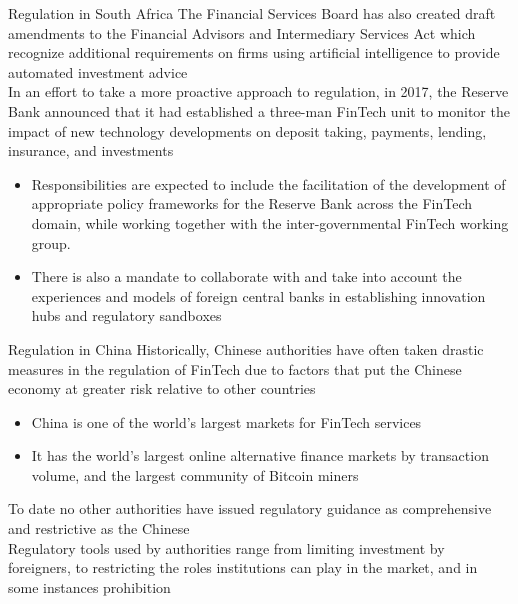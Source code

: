 \documentclass[11pt]{beamer}
\begin{document}

\begin{frame}{Regulation in South Africa}
	The Financial Services Board has also created draft amendments to the Financial Advisors and Intermediary Services Act which recognize additional requirements on firms using artificial intelligence to provide automated investment advice \\ \vspace{3mm}
	In an effort to take a more proactive approach to regulation, in 2017, the Reserve Bank announced that it had established a three-man FinTech unit to monitor the impact of new technology developments on deposit taking, payments, lending, insurance, and investments
	\begin{itemize}
		\item Responsibilities are expected to include the facilitation of the development of appropriate policy frameworks for the Reserve Bank across the FinTech domain, while working together with the inter-governmental FinTech working group.
		\item There is also a mandate to collaborate with and take into account the experiences and models of foreign central banks in establishing innovation hubs and regulatory sandboxes
	\end{itemize}
\end{frame}


\begin{frame}{Regulation in China}
	Historically, Chinese authorities have often taken drastic measures in the regulation of FinTech due to factors that put the Chinese economy at greater risk relative to other countries
	\begin{itemize}
		\item China is one of the world's largest markets for FinTech services
		\item It has the world's largest online alternative finance markets by transaction volume, and the largest community of Bitcoin miners
	\end{itemize}
	To date no other authorities have issued regulatory guidance as comprehensive and restrictive as the Chinese \\ \vspace{3mm}
	Regulatory tools used by authorities range from limiting investment by foreigners, to restricting the roles institutions can play in the market, and in some instances prohibition
\end{frame}
\end{document}
